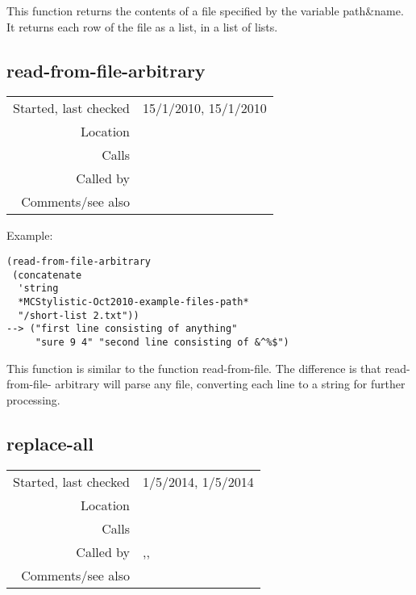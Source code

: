 \noindent This function returns the contents of a file
specified by the variable path\&name. It returns each
row of the file as a list, in a list of lists.


\subsection*{read-from-file-arbitrary}\label{fun:read-from-file-arbitrary}

\vspace{0.3cm}
\begin{tabular}{r|p{8cm}}
Started, last checked & 15/1/2010, 15/1/2010 \\
Location & \nameref{sec:text-files} \\
Calls & \\
Called by & \\
Comments/see also &
\end{tabular}

\vspace{0.5cm}
\noindent Example:
\begin{verbatim}
(read-from-file-arbitrary
 (concatenate
  'string
  *MCStylistic-Oct2010-example-files-path*
  "/short-list 2.txt"))
--> ("first line consisting of anything"
     "sure 9 4" "second line consisting of &^%$")
\end{verbatim}

\noindent This function is similar to the function
read-from-file. The difference is that read-from-file-
arbitrary will parse any file, converting each line to
a string for further processing.


\subsection*{replace-all}\label{fun:replace-all}

\vspace{0.3cm}
\begin{tabular}{r|p{8cm}}
Started, last checked & 1/5/2014, 1/5/2014 \\
Location & \nameref{sec:text-files} \\
Calls & \\
Called by & \nameref{fun:harmonic-interval-of-a},\newline \nameref{fun:pitch-class-time-intervals},\newline \nameref{fun:word-and-event-time-intervals} \\
Comments/see also &
\end{tabular}

